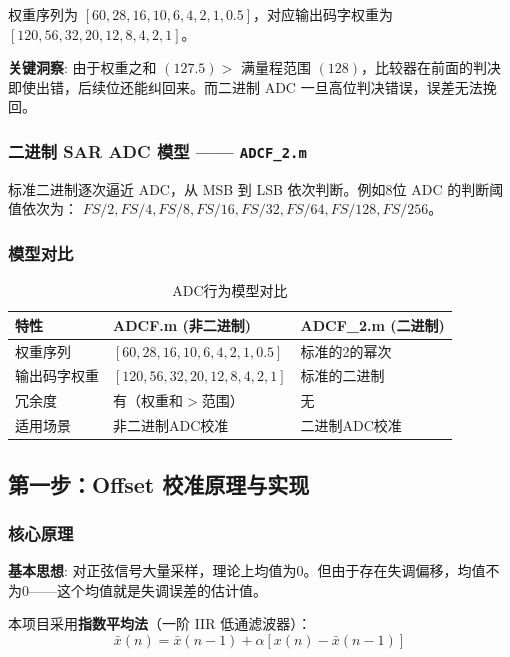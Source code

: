 \documentclass[UTF8,a4paper,11pt]{ctexart}
\begin{document}
权重序列为 $[60, 28, 16, 10, 6, 4, 2, 1, 0.5]$，对应输出码字权重为 $[120, 56, 32, 20, 12, 8, 4, 2, 1]$。

\textbf{关键洞察}: 由于权重之和 $(127.5) > $ 满量程范围 $(128)$，比较器在前面的判决即使出错，后续位还能纠回来。而二进制 ADC 一旦高位判决错误，误差无法挽回。

\subsubsection{二进制 SAR ADC 模型 —— \texttt{ADCF\_2.m}}

标准二进制逐次逼近 ADC，从 MSB 到 LSB 依次判断。例如8位 ADC 的判断阈值依次为：
$FS/2, FS/4, FS/8, FS/16, FS/32, FS/64, FS/128, FS/256$。

\subsubsection{模型对比}

\begin{table}[ht]
\centering
\caption{ADC行为模型对比}
\begin{tabular}{p{3cm}p{4.5cm}p{4.5cm}}
\toprule
\textbf{特性} & \textbf{ADCF.m (非二进制)} & \textbf{ADCF\_2.m (二进制)} \\
\midrule
权重序列 & $[60,28,16,10,6,4,2,1,0.5]$ & 标准的2的幂次 \\
输出码字权重 & $[120,56,32,20,12,8,4,2,1]$ & 标准的二进制 \\
冗余度 & 有（权重和$>$范围） & 无 \\
适用场景 & 非二进制ADC校准 & 二进制ADC校准 \\
\bottomrule
\end{tabular}
\end{table}

\subsection{第一步：Offset 校准原理与实现}
\label{sec:offset_cali}

\subsubsection{核心原理}

\textbf{基本思想}: 对正弦信号大量采样，理论上均值为0。但由于存在失调偏移，均值不为0——这个均值就是失调误差的估计值。

本项目采用\textbf{指数平均法}（一阶 IIR 低通滤波器）：
\begin{equation}
    \bar{x}(n) = \bar{x}(n-1) + \alpha [x(n) - \bar{x}(n-1)]
\end{equation}
\end{document}
